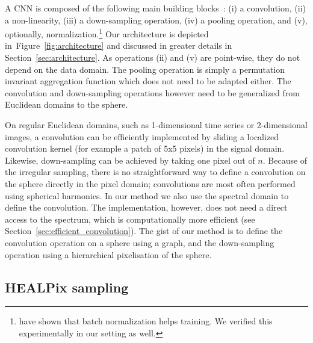 \documentclass[final,twocolumn,3p,times,authoryear]{elsarticle}
\newcommand{\TK}[1]{{\color{red}{TK:#1}}}
\newcommand{\figref}[1]{Figure~\ref{fig:#1}}
\newcommand{\secref}[1]{Section~\ref{sec:#1}}
\newcommand{\1}{\b{1}}              %
\newcommand{\0}{\b{0}}              %
\begin{document}
A CNN is composed of the following main building blocks~\citep{lecun1998cnn}:
(i) a convolution,
(ii) a non-linearity,
(iii) a down-sampling operation,
(iv) a pooling operation, and
(v), optionally,  normalization.\footnote{\citet{ioffe2015batchnorm} have shown that batch normalization helps training. We verified this experimentally in our setting as well.}
Our architecture is depicted in~\figref{architecture} and discussed in greater details in \secref{architecture}. As operations (ii) and (v) are point-wise, they do not depend on the data domain. The pooling operation is simply a permutation invariant aggregation function which does not need to be adapted either. The convolution and down-sampling operations however need to be generalized from Euclidean domains to the sphere.

On regular Euclidean domains, such as 1-dimensional time series or 2-dimensional images, a convolution can be efficiently implemented by sliding a localized convolution kernel (for example a patch of 5x5 pixels) in the signal domain.
Likewise, down-sampling can be achieved by taking one pixel out of $n$.
Because of the irregular sampling, there is no straightforward way to define a convolution on the sphere directly in the pixel domain; convolutions are most often performed using spherical harmonics.
In our method we also use the spectral domain to define the convolution.
The implementation, however, does not need a direct access to the spectrum, which is computationally more efficient (see \secref{efficient_convolution}).
The gist of our method is to define the convolution operation on a sphere using a graph, and the down-sampling operation using a hierarchical pixelisation of the sphere.


\subsection{HEALPix sampling}
\label{sec:healpix}
\end{document}
